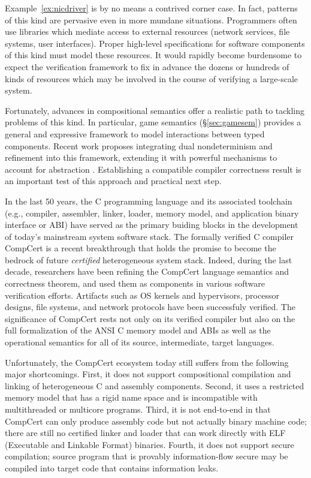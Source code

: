 Example~\ref{ex:nicdriver}
is by no means a contrived corner case.
In fact, patterns of this kind are pervasive even in more mundane situations.
Programmers often use libraries
which mediate access to external resources
(network services, file systems, user interfaces).
Proper high-level specifications
for software components of this kind
must model these resources.
It would rapidly become burdensome to expect
the verification framework
to fix in advance
the dozens or hundreds
of kinds of resources
which may be involved
in the course of verifying a large-scale system.

Fortunately,
advances in compositional semantics
offer a realistic path
to tackling problems of this kind.
In particular,
game semantics (\S\ref{sec:gamesem})
provides a general and expressive framework
to model interactions between typed components.
Recent work proposes integrating
dual nondeterminism and refinement
into this framework,
extending it with powerful mechanisms
to account for abstraction \cite{rbgs-cal}.
Establishing a compatible compiler correctness result
is an important test of this approach
and practical next step.



In the last 50 years, the C programming language and its associated
toolchain (e.g., compiler, assembler, linker, loader, memory model,
and application binary interface or ABI) have served as the primary
buiding blocks in the development of today's mainstream system
software stack. The formally verified C compiler CompCert is a recent
breakthrough that holds the promise to become the bedrock of future
{\em certified} heterogeneous system stack.  Indeed, during the last
decade, researchers have been refining the CompCert language semantics
and correctness theorem, and used them as components in various
software verification efforts. Artifacts such as OS kernels and
hypervisors, processor designs, file systems, and network protocols
have been successfuly verified. The significance of CompCert rests not
only on its verified compiler but also on the full formalization of
the ANSI C memory model and ABIs as well as the operational semantics
for all of its source, intermediate, target languages.

Unfortunately, the CompCert ecosystem today still suffers from the
following major shortcomings. First, it does not support compositional
compilation and linking of heterogeneous C and assembly components.
Second, it uses a restricted memory model that has a rigid name space
and is incompatible with multithreaded or multicore programs.  Third,
it is not end-to-end in that CompCert can only produce assembly code
but not actually binary machine code; there are still no certified
linker and loader that can work directly with ELF (Executable and
Linkable Format) binaries.  Fourth, it does not support secure
compilation; source program that is provably information-flow secure
may be compiled into target code that contains information leaks.

